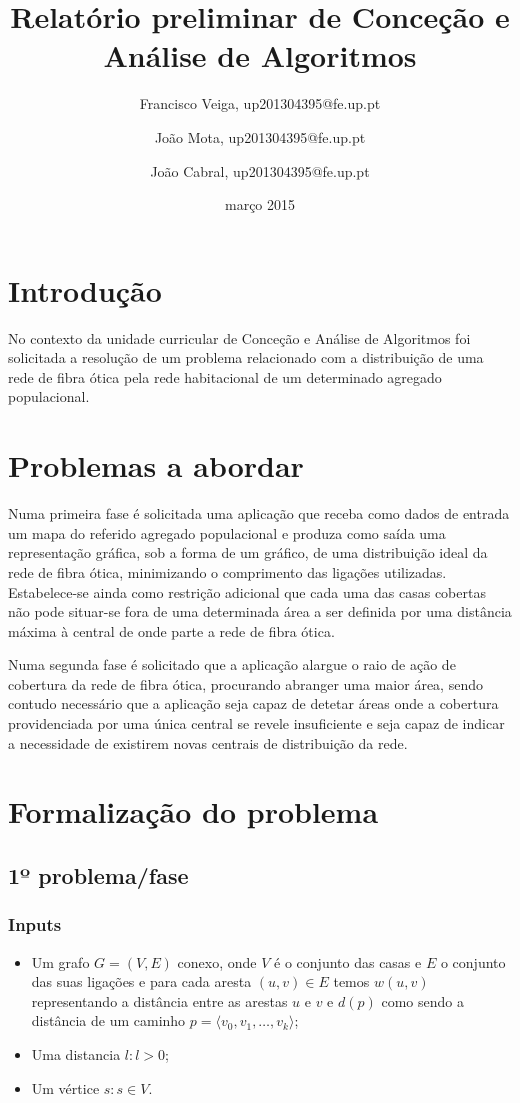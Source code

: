 \documentclass[a4paper,12pt,titlepage]{article}
\begin{document}
\title{Relatório preliminar de Conceção e Análise de Algoritmos}
\date{março 2015}
\author{Francisco Veiga, up201304395@fe.up.pt
 \and João Mota, up201304395@fe.up.pt
 \and João Cabral, up201304395@fe.up.pt}
\maketitle
\tableofcontents
\newpage
\section{Introdução}

No contexto da unidade curricular de Conceção e Análise de Algoritmos foi solicitada a resolução de um problema relacionado com a distribuição de uma rede de fibra ótica pela rede habitacional de um determinado agregado populacional.

\section{Problemas a abordar} 
Numa primeira fase é solicitada uma aplicação que receba como dados de entrada um mapa do referido agregado populacional e produza como saída uma representação gráfica, sob a forma de um gráfico, de uma distribuição ideal da rede de fibra ótica, minimizando o comprimento das ligações utilizadas. Estabelece-se ainda como restrição adicional que cada uma das casas cobertas não pode situar-se fora de uma determinada área a ser definida por uma distância máxima à central de onde parte a rede de fibra ótica.
 
Numa segunda fase é solicitado que a aplicação alargue o raio de ação de cobertura da rede de fibra ótica, procurando abranger uma maior área, sendo contudo necessário que a aplicação seja capaz de detetar áreas onde a cobertura providenciada por uma única central se revele insuficiente e seja capaz de indicar a necessidade de existirem novas centrais de distribuição da rede.

\newpage
\section{Formalização do problema}

\subsection{1º problema/fase}
\subsubsection*{Inputs}
\begin{itemize}
\item Um grafo  $G= ( V, E ) $ conexo, onde $V$ é o conjunto das casas e $E$ o conjunto das suas ligações e para cada aresta $(u,v)\in E$ temos $w(u,v)$ representando a distância entre as arestas $u$ e $v$ e $d(p)$ como sendo a distância de um caminho $p = \langle v_0,v_1,\ldots , v_k\rangle$\cite[p.~624]{intro_algo};
\item Uma distancia $l:l > 0$;
\item Um vértice $s:s\in V$.
\end{itemize}
\end{document}
